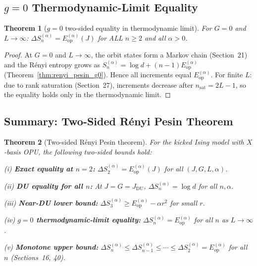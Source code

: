 \documentclass[12pt,a4paper]{article}
\newtheorem{theorem}{Theorem}[section]
\begin{document}
\subsection{$g=0$ Thermodynamic-Limit Equality}
\label{subsec:g0_thermo}

\begin{theorem}[$g=0$ two-sided equality in thermodynamic limit]\label{thm:g0_twosided}
For $G=0$ and $L\to\infty$:
$\Delta S_n^{(\alpha)}=E_\mathrm{op}^{(\alpha)}(J)$ for ALL $n\geq2$ and all $\alpha>0$.
\end{theorem}

\begin{proof}
At $G=0$ and $L\to\infty$, the orbit states form a Markov chain (Section~21)
and the Rényi entropy grows as $S_n^{(\alpha)}=\log d + (n-1)E_\mathrm{op}^{(\alpha)}$
(Theorem~\ref{thm:renyi_pesin_g0}).  Hence all increments equal $E_\mathrm{op}^{(\alpha)}$.
For finite $L$: due to rank saturation (Section~27), increments decrease after
$n_\mathrm{sat}=2L-1$, so the equality holds only in the thermodynamic limit.
\end{proof}

\subsection{Summary: Two-Sided Rényi Pesin Theorem}
\label{subsec:twosided_summary}

\begin{theorem}[Two-sided Rényi Pesin theorem]\label{thm:two_sided_main}
For the kicked Ising model with $X$-basis OPU, the following two-sided bounds hold:

\smallskip
\noindent
(i) \textbf{Exact equality at $n=2$:}
$\Delta S_2^{(\alpha)}=E_\mathrm{op}^{(\alpha)}(J)$ for all $(J,G,L,\alpha)$.

\smallskip
\noindent
(ii) \textbf{DU equality for all $n$:}
At $J=G=J_\mathrm{DU}$, $\Delta S_n^{(\alpha)}=\log d$ for all $n,\alpha$.

\smallskip
\noindent
(iii) \textbf{Near-DU lower bound:}
$\Delta S_3^{(\alpha)}\geq E_\mathrm{op}^{(\alpha)}-\alpha r^2$ for small $r$.

\smallskip
\noindent
(iv) \textbf{$g=0$ thermodynamic-limit equality:}
$\Delta S_n^{(\alpha)}=E_\mathrm{op}^{(\alpha)}$ for all $n$ as $L\to\infty$.

\smallskip
\noindent
(v) \textbf{Monotone upper bound:}
$\Delta S_n^{(\alpha)}\leq\Delta S_{n-1}^{(\alpha)}\leq\cdots\leq\Delta S_2^{(\alpha)}
=E_\mathrm{op}^{(\alpha)}$ for all $n$ (Sections~16, 40).
\end{theorem}
\end{document}
